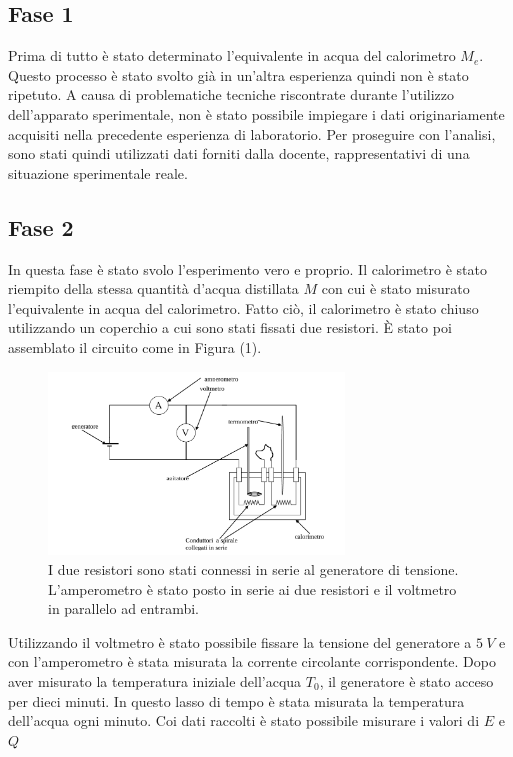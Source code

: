 \subsection{Fase 1}
Prima di tutto è stato determinato l'equivalente in acqua del calorimetro $M_e$. Questo processo è stato svolto già in un'altra esperienza quindi non è stato ripetuto. A causa di problematiche tecniche riscontrate durante l'utilizzo dell'apparato sperimentale, non è stato possibile impiegare i dati originariamente acquisiti nella precedente esperienza di laboratorio. Per proseguire con l'analisi, sono stati quindi utilizzati dati forniti dalla docente, rappresentativi di una situazione sperimentale reale.

\subsection{Fase 2}
In questa fase è stato svolo l'esperimento vero e proprio. Il calorimetro è stato riempito della stessa quantità d'acqua distillata $M$ con cui è stato misurato l'equivalente in acqua del calorimetro. Fatto ciò, il calorimetro è stato chiuso utilizzando un coperchio a cui sono stati fissati due resistori. È stato poi assemblato il circuito come in Figura (1).

\begin{figure}[H]
	\centering
	\includegraphics[width=0.70\textwidth]{./figures/Circuito}
	\caption{I due resistori sono stati connessi in serie al generatore di tensione. L'amperometro è stato posto in serie ai due resistori e il voltmetro in parallelo ad entrambi.}
\end{figure}

Utilizzando il voltmetro è stato possibile fissare la tensione del generatore a $5\ V$ e con l'amperometro è stata misurata la corrente circolante corrispondente. Dopo aver misurato la temperatura iniziale dell'acqua $T_0$, il generatore è stato acceso per dieci minuti. In questo lasso di tempo è stata misurata la temperatura dell'acqua ogni minuto. Coi dati raccolti è stato possibile misurare i valori di $E$ e $Q$
